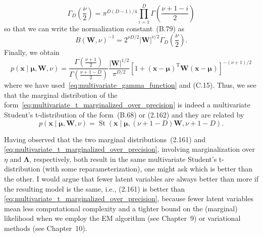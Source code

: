 \documentclass[12pt,a4paper]{article}
\begin{document}
\begin{equation}
\Gamma_D \left(\frac{\nu}{2}\right) =
\pi^{D(D - 1)/4} \prod_{i=1}^{D} \Gamma\left(\frac{\nu + 1 - i}{2}\right)
\label{eq:multivariate_gamma_function}
\end{equation}
so that we can write the normalization constant~(B.79) as
\begin{equation}
B(\mathbf{W}, \nu)^{-1} =
2^{\nu D/2}
\left|\mathbf{W}\right|^{\nu/2}
\Gamma_D\left(\frac{\nu}{2}\right) .
\end{equation}
Finally, we obtain
\begin{equation}
p\left(\mathbf{x}\middle|\bm{\mu}, \mathbf{W}, \nu\right)
=
\frac{\Gamma\left(\frac{\nu + 1}{2}\right)}{\Gamma\left(\frac{\nu + 1 - D}{2}\right)}
\frac{\left|\mathbf{W}\right|^{1/2}}{\pi^{D/2}}
\left[
  1 + 
  \left(\mathbf{x} - \bm{\mu}\right)^{\operatorname{T}}
  \mathbf{W}
  \left(\mathbf{x} - \bm{\mu}\right)
\right]^{-(\nu + 1)/2}
\end{equation}
where we have used~\eqref{eq:multivariate_gamma_function} and (C.15).
Thus, we see that the marginal distribution of
the form~\eqref{eq:multivariate_t_marginalized_over_precision}
is indeed a multivariate Student's t-distribution of the form~(B.68) or (2.162) and
they are related by
\begin{equation}
p\left(\mathbf{x}\middle|\bm{\mu}, \mathbf{W}, \nu\right)
=
\operatorname{St}\left(
  \mathbf{x}\middle|\bm{\mu},
  (\nu + 1 - D) \mathbf{W},
  \nu + 1 - D
\right) .
\label{eq:wishart_marginal_and_multivariate_t}
\end{equation}

Having observed that the two marginal
distributions~(2.161) and \eqref{eq:multivariate_t_marginalized_over_precision},
involving marginalization over $\eta$ and $\bm{\Lambda}$, respectively, both result in
the same multivariate Student's t-distribution (with some reparameterization),
one might ask which is better than the other.
I would argue that fewer latent variables are always better than more if the resulting model
is the same, i.e., (2.161) is better than \eqref{eq:multivariate_t_marginalized_over_precision},
because fewer latent variables mean less computational complexity and
a tighter bound on the (marginal) likelihood
when we employ the EM algorithm (see Chapter~9) or variational methods (see Chapter~10).
\end{document}
